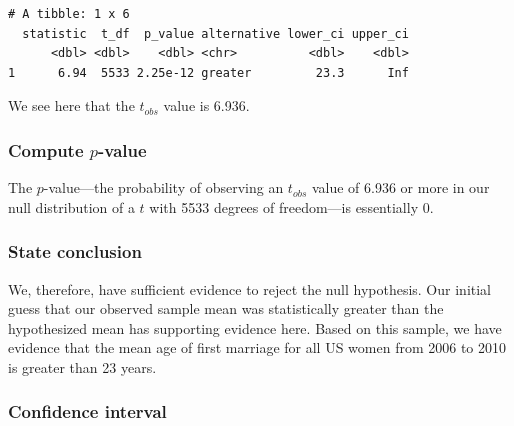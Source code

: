 \documentclass[12pt,]{krantz}
\makeatletter
\newenvironment{Shaded}{\begin{snugshade}}{\end{snugshade}}
\newcommand{\KeywordTok}[1]{\textcolor[rgb]{0.27,0.27,0.27}{\textbf{#1}}}
\newcommand{\DataTypeTok}[1]{\textcolor[rgb]{0.27,0.27,0.27}{#1}}
\newcommand{\DecValTok}[1]{\textcolor[rgb]{0.06,0.06,0.06}{#1}}
\newcommand{\StringTok}[1]{\textcolor[rgb]{0.5,0.5,0.5}{#1}}
\newcommand{\OtherTok}[1]{\textcolor[rgb]{0.37,0.37,0.37}{#1}}
\newcommand{\OperatorTok}[1]{\textcolor[rgb]{0.43,0.43,0.43}{\textbf{#1}}}
\newcommand{\NormalTok}[1]{#1}
\newenvironment{kframe}{%
\medskip{}
\setlength{\fboxsep}{.8em}
 \def\at@end@of@kframe{}%
 \ifinner\ifhmode%
  \def\at@end@of@kframe{\end{minipage}}%
  \begin{minipage}{\columnwidth}%
 \fi\fi%
 \def\FrameCommand##1{\hskip\@totalleftmargin \hskip-\fboxsep
 \colorbox{shadecolor}{##1}\hskip-\fboxsep
     \hskip-\linewidth \hskip-\@totalleftmargin \hskip\columnwidth}%
 \MakeFramed {\advance\hsize-\width
   \@totalleftmargin\z@ \linewidth\hsize
   \@setminipage}}%
 {\par\unskip\endMakeFramed%
 \at@end@of@kframe}
\renewenvironment{Shaded}{\begin{kframe}}{\end{kframe}}
\makeatother
\begin{document}
\begin{Shaded}
\end{Shaded}

\begin{verbatim}
# A tibble: 1 x 6
  statistic  t_df  p_value alternative lower_ci upper_ci
      <dbl> <dbl>    <dbl> <chr>          <dbl>    <dbl>
1      6.94  5533 2.25e-12 greater         23.3      Inf
\end{verbatim}

We see here that the \(t_{obs}\) value is 6.936.

\subsubsection*{\texorpdfstring{Compute
\(p\)-value}{Compute p-value}}\label{compute-p-value}


The \(p\)-value---the probability of observing an \(t_{obs}\) value of
6.936 or more in our null distribution of a \(t\) with 5533 degrees of
freedom---is essentially 0.

\subsubsection*{State conclusion}\label{state-conclusion}


We, therefore, have sufficient evidence to reject the null hypothesis.
Our initial guess that our observed sample mean was statistically
greater than the hypothesized mean has supporting evidence here. Based
on this sample, we have evidence that the mean age of first marriage for
all US women from 2006 to 2010 is greater than 23 years.

\subsubsection*{Confidence interval}\label{confidence-interval}


\begin{Shaded}
\end{Shaded}
\end{document}
